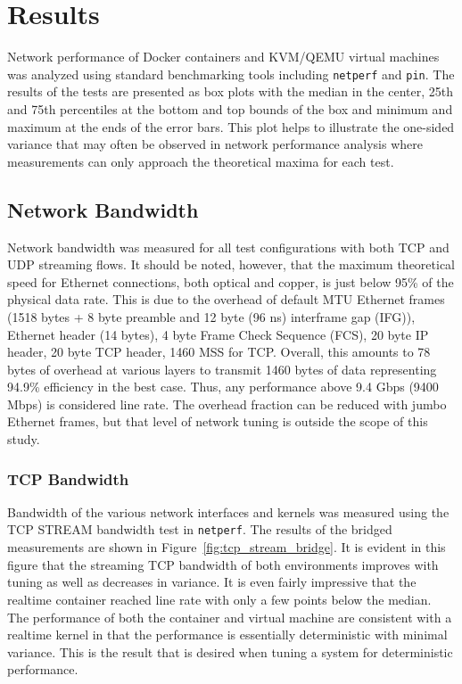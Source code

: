 \chapter{Results}
\label{cha:results}
\label{sec:results}
Network performance of Docker containers and KVM/QEMU virtual machines was analyzed using standard benchmarking tools including \texttt{netperf} and \texttt{pin}.  
The results of the tests are presented as box plots with the median in the center, 25th and 75th percentiles at the bottom and top bounds of the box and minimum and maximum at the ends of the error bars.
This plot helps to illustrate the one-sided variance that may often be observed in network performance analysis where measurements can only approach the theoretical maxima for each test.  

\section{Network Bandwidth} %
\label{sec:networkbandwidth}
Network bandwidth was measured for all test configurations with both TCP and UDP streaming flows.
It should be noted, however, that the maximum theoretical speed for Ethernet connections, both optical and copper, is just below 95\% of the physical data rate.
This is due to the overhead of default MTU Ethernet frames (1518 bytes + 8 byte preamble and 12 byte (96 ns) interframe gap (IFG)), Ethernet header (14 bytes), 4 byte Frame Check Sequence (FCS), 20 byte IP header, 20 byte TCP header, 1460 MSS for TCP.
Overall, this amounts to 78 bytes of overhead at various layers to transmit 1460 bytes of data representing 94.9\% efficiency in the best case.  
Thus, any performance above 9.4 Gbps (9400 Mbps) is considered line rate.  
The overhead fraction can be reduced with jumbo Ethernet frames, but that level of network tuning is outside the scope of this study.

\subsection{TCP Bandwidth} %
\label{sub:tcpbandwidth}
Bandwidth of the various network interfaces and kernels was measured using the TCP STREAM bandwidth test in \texttt{netperf}.
The results of the bridged measurements are shown in Figure~\ref{fig:tcp_stream_bridge}. 
It is evident in this figure that the streaming TCP bandwidth of both environments improves with tuning as well as decreases in variance.  
It is even fairly impressive that the realtime container reached line rate with only a few points below the median.  
The performance of both the container and virtual machine are consistent with a realtime kernel in that the performance is essentially deterministic with minimal variance.
This is the result that is desired when tuning a system for deterministic performance.

